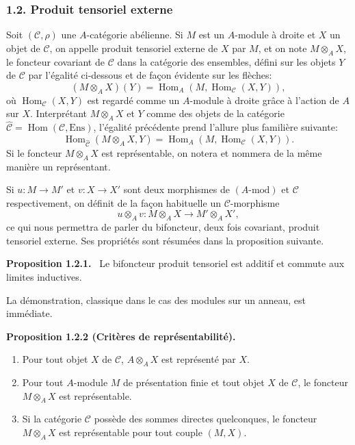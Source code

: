 \documentclass[11pt]{article}
\newenvironment{statement}[1]{\par\medskip\noindent\textbf{#1.}\ }{\par\medskip}
\DeclareMathOperator{\Hom}{Hom}
\providecommand{\Hom}{\operatorname{Hom}}
\providecommand{\Ens}{\mathrm{Ens}}
\providecommand{\cC}{\mathcal C}
\providecommand{\Ens}{\operatorname{Ens}}
\providecommand{\cC}{\mathcal C}
\begin{document}
\subsubsection*{1.2. Produit tensoriel externe}
Soit $(\cC,\rho)$ une $A$-catégorie abélienne. Si $M$ est un $A$-module à droite et $X$ un objet de $\cC$, on appelle produit tensoriel externe de $X$ par $M$, et on note $M\otimes_A X$, le foncteur covariant de $\cC$ dans la catégorie des ensembles, défini sur les objets $Y$ de $\cC$ par l'égalité ci-dessous et de façon évidente sur les flèches:
\[
(M\otimes_A X)(Y)=\Hom_A(M,\Hom_{\cC}(X,Y)),
\]
où $\Hom_{\cC}(X,Y)$ est regardé comme un $A$-module à droite grâce à l'action de $A$ sur $X$. Interprétant $M\otimes_AX$ et $Y$ comme des objets de la catégorie $\widehat{\cC}=\Hom(\cC,\Ens)$, l'égalité précédente prend l'allure plus familière suivante:
\[
\Hom_{\widehat{\cC}}(M\otimes_A X,Y)=\Hom_A(M,\Hom_{\cC}(X,Y)).
\]
Si le foncteur $M\otimes_A X$ est représentable, on notera et nommera de la même manière un représentant.

Si $u:M\to M'$ et $v:X\to X'$ sont deux morphismes de $(A\text{-mod})$ et $\cC$ respectivement, on définit de la façon habituelle un $\cC$-morphisme
\[
u\otimes_A v:M\otimes_A X\longrightarrow M'\otimes_A X',
\]
ce qui nous permettra de parler du bifoncteur, deux fois covariant, produit tensoriel externe. Ses propriétés sont résumées dans la proposition suivante.

\begin{statement}{Proposition 1.2.1}
Le bifoncteur produit tensoriel est additif et commute aux limites inductives.
\end{statement}
La démonstration, classique dans le cas des modules sur un anneau, est immédiate.

\begin{statement}{Proposition 1.2.2 (Critères de représentabilité)}
\begin{enumerate}[label=(\alph*)]
\item Pour tout objet $X$ de $\cC$, $A\otimes_AX$ est représenté par $X$.
\item Pour tout $A$-module $M$ de présentation finie et tout objet $X$ de $\cC$, le foncteur $M\otimes_AX$ est représentable.
\item Si la catégorie $\cC$ possède des sommes directes quelconques, le foncteur $M\otimes_A X$ est représentable pour tout couple $(M,X)$.
\end{enumerate}
\end{statement}
\end{document}
